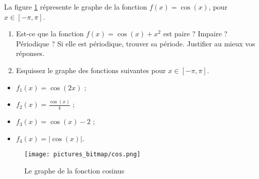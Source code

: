 
\begin{exercice}\label{exoDS2012-2-0001}


La figure \ref{graphecos} r\'epresente le graphe de la fonction $f(x)=\cos(x)$, pour $x\in[-\pi,\pi]$. 

\begin{enumerate}
\item Est-ce que la fonction $f(x)=\cos(x)+x^2$ est paire ? Impaire ? P\'eriodique ? Si elle est p\'eriodique, trouver sa p\'eriode. Justifier au mieux vos r\'eponses.
\item Esquissez le graphe des fonctions suivantes pour $x\in[-\pi,\pi]$. 
\end{enumerate}

\begin{multicols}{1}
  \begin{itemize}
    \renewcommand{\labelitemi}{$\bullet$}
  \item $f_1(x)=\cos(2x)$ ;
  \item $f_2(x)=\frac{\cos(x)}{4}$ ;
  \item $f_3(x)=\cos(x)-2$ ;
  \item $f_4(x)=|\cos(x)|$.
  \end{itemize}
\end{multicols}

\begin{figure}[h]
  \begin{center}
     \caption{Le graphe de la fonction cosinus}
   \texttt{[image: pictures\_bitmap/cos.png]}\label{graphecos}
  \end{center}
 
\end{figure}

\end{exercice}
